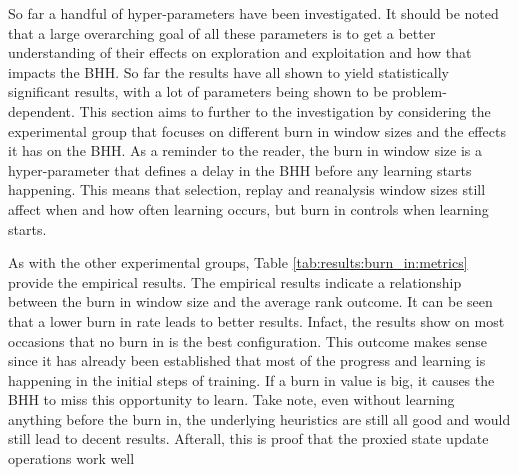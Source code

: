 So far a handful of hyper-parameters have been investigated. It should be noted that a large overarching goal of all these parameters is to get a better understanding of their effects on exploration and exploitation and how that impacts the \Ac{BHH}. So far the results have all shown to yield statistically significant results, with a lot of parameters being shown to be problem-dependent. This section aims to further to the investigation by considering the experimental group that focuses on different burn in window sizes and the effects it has on the \Ac{BHH}. As a reminder to the reader, the burn in window size is a hyper-parameter that defines a delay in the \Ac{BHH} before any learning starts happening. This means that selection, replay and reanalysis window sizes still affect when and how often learning occurs, but burn in controls when learning starts.

As with the other experimental groups, Table \ref{tab:results:burn_in:metrics} provide the empirical results. The empirical results indicate a relationship between the burn in window size and the average rank outcome. It can be seen that a lower burn in rate leads to better results. Infact, the results show on most occasions that no burn in is the best configuration. This outcome makes sense since it has already been established that most of the progress and learning is happening in the initial steps of training. If a burn in value is big, it causes the \Ac{BHH} to miss this opportunity to learn. Take note, even without learning anything before the burn in, the underlying heuristics are still all good and would still lead to decent results. Afterall, this is proof that the proxied state update operations work well


